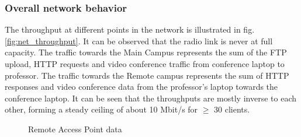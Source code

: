 \documentclass[
10pt, %
a4paper, %
oneside, %
headinclude,footinclude, %
BCOR5mm, %
]{scrartcl}
\begin{document}
\subsubsection{Overall network behavior}

The throughput at different points in the network is illustrated in fig. \ref{fig:net_throughput}. It can be observed that the radio link is never at full capacity. The traffic towards the Main Campus represents the sum of the FTP upload, HTTP requests and video conference traffic from conference laptop to professor. The traffic towards the Remote campus represents the sum of HTTP responses and video conference data from the professor's laptop towards the conference laptop. It can be seen that the throughputs are mostly inverse to each other, forming a steady ceiling of about 10 Mbit/s for $\geq$ 30 clients.\\

\begin{figure}[!ht]%
    \caption{Remote Access Point data}%
    \label{fig:rap_data}%
\end{figure}
\end{document}
